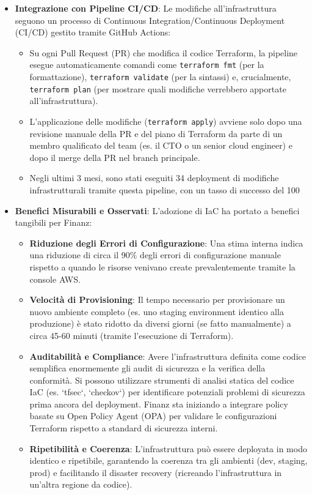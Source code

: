 \begin{itemize}
\begin{itemize}
        \end{itemize}
    \item \textbf{Integrazione con Pipeline CI/CD}: Le modifiche all'infrastruttura seguono un processo di Continuous Integration/Continuous Deployment (CI/CD) gestito tramite GitHub Actions:
        \begin{itemize}
            \item Su ogni Pull Request (PR) che modifica il codice Terraform, la pipeline esegue automaticamente comandi come \texttt{terraform fmt} (per la formattazione), \texttt{terraform validate} (per la sintassi) e, crucialmente, \texttt{terraform plan} (per mostrare quali modifiche verrebbero apportate all'infrastruttura).
            \item L'applicazione delle modifiche (\texttt{terraform apply}) avviene solo dopo una revisione manuale della PR e del piano di Terraform da parte di un membro qualificato del team (es. il CTO o un senior cloud engineer) e dopo il merge della PR nel branch principale.
            \item Negli ultimi 3 mesi, sono stati eseguiti 34 deployment di modifiche infrastrutturali tramite questa pipeline, con un tasso di successo del 100%
        \end{itemize}
    \item \textbf{Benefici Misurabili e Osservati}: L'adozione di IaC ha portato a benefici tangibili per Finanz:
        \begin{itemize}
            \item \textbf{Riduzione degli Errori di Configurazione}: Una stima interna indica una riduzione di circa il 90\% degli errori di configurazione manuale rispetto a quando le risorse venivano create prevalentemente tramite la console AWS.
            \item \textbf{Velocità di Provisioning}: Il tempo necessario per provisionare un nuovo ambiente completo (es. uno staging environment identico alla produzione) è stato ridotto da diversi giorni (se fatto manualmente) a circa 45-60 minuti (tramite l'esecuzione di Terraform).
            \item \textbf{Auditabilità e Compliance}: Avere l'infrastruttura definita come codice semplifica enormemente gli audit di sicurezza e la verifica della conformità. Si possono utilizzare strumenti di analisi statica del codice IaC (es. `tfsec`, `checkov`) per identificare potenziali problemi di sicurezza prima ancora del deployment. Finanz sta iniziando a integrare policy basate su Open Policy Agent (OPA) per validare le configurazioni Terraform rispetto a standard di sicurezza interni.
            \item \textbf{Ripetibilità e Coerenza}: L'infrastruttura può essere deployata in modo identico e ripetibile, garantendo la coerenza tra gli ambienti (dev, staging, prod) e facilitando il disaster recovery (ricreando l'infrastruttura in un'altra regione da codice).
        \end{itemize}
\end{itemize}
